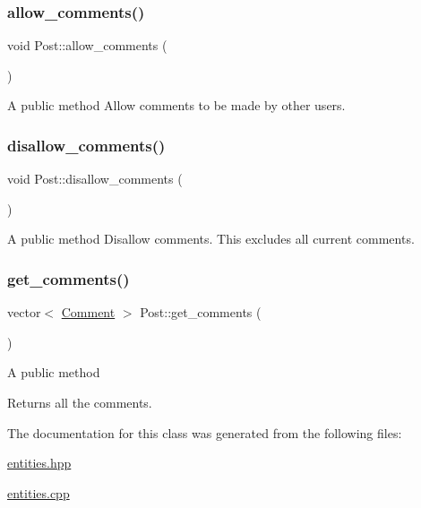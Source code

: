 \subsubsection{\texorpdfstring{allow\+\_\+comments()}{allow\_comments()}}
{\footnotesize\ttfamily void Post\+::allow\+\_\+comments (\begin{DoxyParamCaption}{ }\end{DoxyParamCaption})}

A public method Allow comments to be made by other users. \mbox{\label{class_post_ab2bf16185ad34d5cfca23785bc2a95e6}} 
\subsubsection{\texorpdfstring{disallow\+\_\+comments()}{disallow\_comments()}}
{\footnotesize\ttfamily void Post\+::disallow\+\_\+comments (\begin{DoxyParamCaption}{ }\end{DoxyParamCaption})}

A public method Disallow comments. This excludes all current comments. \mbox{\label{class_post_a026bd803b219f1cb373d3041c53261eb}} 
\subsubsection{\texorpdfstring{get\+\_\+comments()}{get\_comments()}}
{\footnotesize\ttfamily vector$<$ \hyperlink{class_comment}{Comment} $>$ Post\+::get\+\_\+comments (\begin{DoxyParamCaption}{ }\end{DoxyParamCaption})}

A public method \begin{DoxyReturn}{Returns}
all the comments. 
\end{DoxyReturn}


The documentation for this class was generated from the following files\+:\begin{DoxyCompactItemize}
\item 
\hyperlink{entities_8hpp}{entities.\+hpp}\item 
\hyperlink{entities_8cpp}{entities.\+cpp}\end{DoxyCompactItemize}
